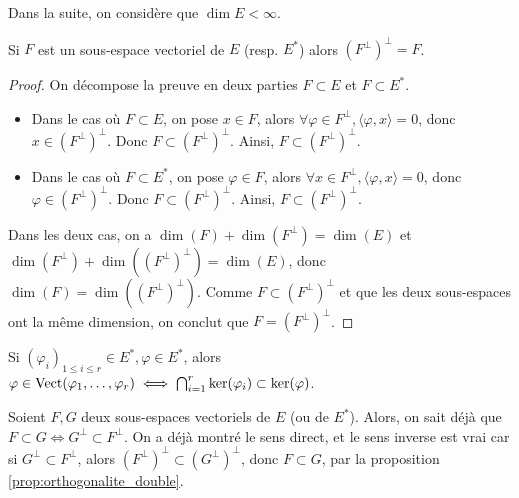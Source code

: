 \documentclass[11pt,a4paper]{report}
\begin{document}
\begin{attention}
    Dans la suite, on considère que $\dim E < \infty$.
\end{attention}

\begin{proposition}
    \label{prop:orthogonalite_double}
    Si $F$ est un sous-espace vectoriel de $E$ (resp. $E^*$) alors $\left(F^\perp\right)^\perp = F$.
\end{proposition}

\begin{proof}
    On décompose la preuve en deux parties $F \subset E$ et $F \subset E^*$.
    \begin{itemize}
        \item Dans le cas où $F \subset E$, on pose $x \in F$, alors $\forall \varphi \in F^\perp, \langle \varphi, x \rangle = 0$, donc $x \in (F^\perp)^\perp$. Donc $F \subset (F^\perp)^\perp$. Ainsi, $F \subset (F^\perp)^\perp$.
        \item Dans le cas où $F \subset E^*$, on pose $\varphi \in F$, alors $\forall x \in F^\perp, \langle \varphi, x \rangle = 0$, donc $\varphi \in (F^\perp)^\perp$. Donc $F \subset (F^\perp)^\perp$. Ainsi, $F \subset (F^\perp)^\perp$.
    \end{itemize}
    Dans les deux cas, on a $\dim(F) + \dim(F^\perp) = \dim(E)$ et $\dim(F^\perp) + \dim((F^\perp)^\perp) = \dim(E)$, donc $\dim(F) = \dim((F^\perp)^\perp)$. Comme $F \subset (F^\perp)^\perp$ et que les deux sous-espaces ont la même dimension, on conclut que $F = (F^\perp)^\perp$.
\end{proof}

\begin{proposition}
    \label{prop:orthogonalite_intersection}
    Si $(\varphi_i)_{1 \le i \le r} \in E^*, \varphi \in E^*$, alors $\varphi \in \mathrm{Vect}(\varphi_1, \dots, \varphi_r) \iff \bigcap_{i=1}^r \ker(\varphi_i) \subset \ker(\varphi)$.
\end{proposition}

\begin{remark}
    Soient $F, G$ deux sous-espaces vectoriels de $E$ (ou de $E^*$). Alors, on sait déjà que $F \subset G \iff G^\perp \subset F^\perp$. On a déjà montré le sens direct, et le sens inverse est vrai car si $G^\perp \subset F^\perp$, alors $(F^\perp)^\perp \subset (G^\perp)^\perp$, donc $F \subset G$, par la proposition \ref{prop:orthogonalite_double}.
\end{remark}
\end{document}
